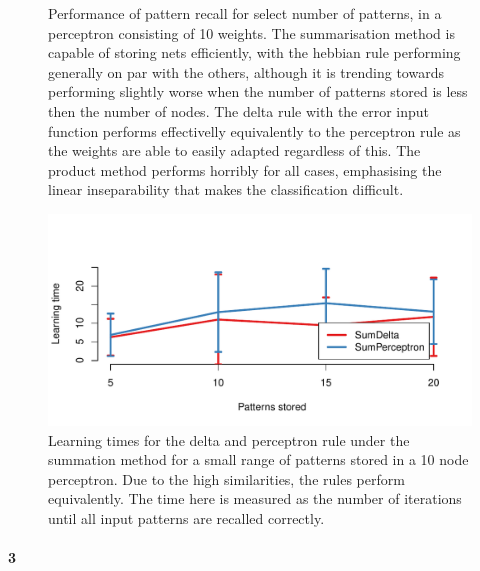 \documentclass[10pt]{article}\usepackage[]{graphicx}\usepackage[]{color}
\makeatletter
\def\maxwidth{ %
  \ifdim\Gin@nat@width>\linewidth
    \linewidth
  \else
    \Gin@nat@width
  \fi
}
\theoremstyle{plain}
\makeatother
\begin{document}
\begin{multicols*}{2}
\begin{Schunk}
\begin{figure}[H]
{}

\caption[Performance of pattern recall for select number of patterns, in a perceptron consisting of 10 weights]{Performance of pattern recall for select number of patterns, in a perceptron consisting of 10 weights. The summarisation method is capable of storing nets efficiently, with the hebbian rule performing generally on par with the others, although it is trending towards performing slightly worse when the number of patterns stored is less then the number of nodes. The delta rule with the error input function performs effectivelly equivalently to the perceptron rule as the weights are able to easily adapted regardless of this. The product method performs horribly for all cases, emphasising the linear inseparability that makes the classification difficult.}\label{fig:performance}
\end{figure}
\end{Schunk}

\begin{Schunk}
\begin{figure}[H]

{\centering \includegraphics[width=\maxwidth]{../figures/twocolumn-perf_time-1} 

}

\caption[Learning times for the delta and perceptron rule under the summation method for a small range of patterns stored in a 10 node perceptron]{Learning times for the delta and perceptron rule under the summation method for a small range of patterns stored in a 10 node perceptron. Due to the high similarities, the rules perform equivalently. The time here is measured as the number of iterations until all input patterns are recalled correctly.}\label{fig:perf_time}
\end{figure}
\end{Schunk}
	
\paragraph*{3}	





\end{multicols*}
\end{document}
